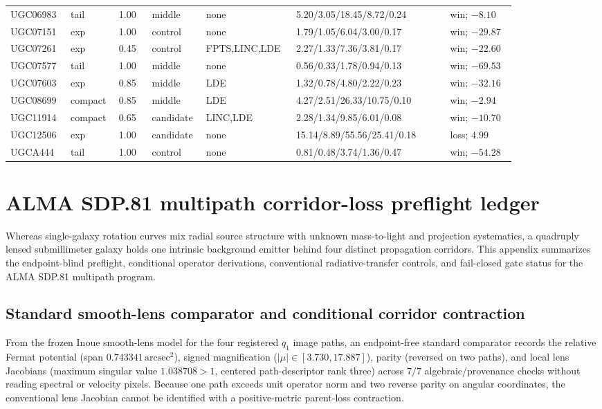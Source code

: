 \documentclass[11pt]{article}
\begin{document}
\begin{landscape}
\begin{longtable}{@{}p{0.105\linewidth}p{0.070\linewidth}p{0.060\linewidth}p{0.085\linewidth}p{0.130\linewidth}p{0.280\linewidth}p{0.120\linewidth}@{}}
UGC06983 & tail & 1.00 & middle & none & 5.20/3.05/18.45/8.72/0.24 & win; $-8.10$ \\
UGC07151 & exp & 1.00 & control & none & 1.79/1.05/6.04/3.00/0.17 & win; $-29.87$ \\
UGC07261 & exp & 0.45 & control & FPTS,LINC,LDE & 2.27/1.33/7.36/3.81/0.17 & win; $-22.60$ \\
UGC07577 & tail & 1.00 & middle & none & 0.56/0.33/1.78/0.94/0.13 & win; $-69.53$ \\
UGC07603 & exp & 0.85 & middle & LDE & 1.32/0.78/4.80/2.22/0.23 & win; $-32.16$ \\
UGC08699 & compact & 0.85 & middle & LDE & 4.27/2.51/26.33/10.75/0.10 & win; $-2.94$ \\
UGC11914 & compact & 0.65 & candidate & LINC,LDE & 2.28/1.34/9.85/6.01/0.08 & win; $-10.70$ \\
UGC12506 & exp & 1.00 & candidate & none & 15.14/8.89/55.56/25.41/0.18 & loss; $4.99$ \\
UGCA444 & tail & 1.00 & control & none & 0.81/0.48/3.74/1.36/0.47 & win; $-54.28$ \\
\end{longtable}
\endgroup
\end{landscape}

\section{ALMA SDP.81 multipath corridor-loss preflight ledger}
\label{app:sdp81-corridor-ledger}

Whereas single-galaxy rotation curves mix radial source structure with unknown
mass-to-light and projection systematics, a quadruply lensed submillimeter
galaxy holds one intrinsic background emitter behind four distinct propagation
corridors. This appendix summarizes the endpoint-blind preflight, conditional
operator derivations, conventional radiative-transfer controls, and fail-closed
gate status for the ALMA SDP.81 multipath program.

\subsection{Standard smooth-lens comparator and conditional corridor contraction}

From the frozen Inoue smooth-lens model for the four registered $q_1$ image
paths, an endpoint-free standard comparator records the relative Fermat
potential (span $0.743341\,\mathrm{arcsec}^2$), signed magnification
($|\mu|\in[3.730,17.887]$), parity (reversed on two paths), and local lens
Jacobians (maximum singular value $1.038708>1$, centered path-descriptor rank
three) across $7/7$ algebraic/provenance checks without reading spectral or
velocity pixels. Because one path exceeds unit operator norm and two reverse
parity on angular coordinates, the conventional lens Jacobian cannot be
identified with a positive-metric parent-loss contraction.
\end{document}
